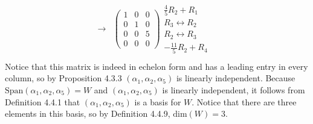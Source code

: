 \documentclass[12pt]{article}
\newenvironment{problem}[2][Problem]
{
	\begin{trivlist} 
		\item[\hskip \labelsep {\bfseries #1 #2:}]
	}
{
	\end{trivlist}
	}
\newenvironment{solution}[1][Solution]
{
	\begin{trivlist} 
		\item[\hskip \labelsep {\itshape #1:}]
	}
	{
	\end{trivlist}
}
\begin{document}
\begin{problem}{3}
\begin{solution}
\begin{align*}
%
\rightarrow& \begin{pmatrix} 1&0&0\\0&1&0\\0&0&5\\0&0&0 \end{pmatrix} \begin{matrix} \frac{4}{5}R_2+R_1\text{ } \\  R_3\leftrightarrow R_2 \text{ } \\ R_2 \leftrightarrow R_3 \text{ } \\ -\frac{11}{5}R_2 + R_4 \text{ } \end{matrix}\\
\end{align*}
Notice that this matrix is indeed in echelon form and has a leading entry in every column, so by Proposition 4.3.3 $(\alpha_1,\alpha_2,\alpha_5)$ is linearly independent. Because $\text{Span}(\alpha_1,\alpha_2,\alpha_5) = W$ and $(\alpha_1,\alpha_2,\alpha_5)$ is linearly independent, it follows from Definition 4.4.1 that $(\alpha_1,\alpha_2,\alpha_5)$ is a basis for $W$. Notice that there are three elements in this basis, so by Definition 4.4.9, $\text{dim}(W) = 3$.


\end{solution}
\end{problem}
\end{document}
